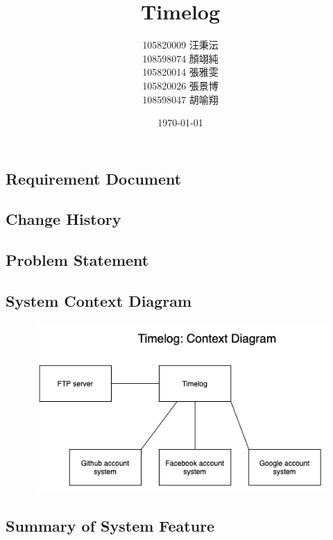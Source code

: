 \documentclass[12pt, a4paper]{article}
\title{Timelog}
\author{105820009 汪秉沄\\
108598074 顏翊純\\
105820014 張雅雯\\
105820026 張景博\\
108598047 胡喻翔}
\date{\today}
\begin{document}
\begin{CJK*}{UTF8}{bkai}
\maketitle
\newpage

\tableofcontents
\newpage


\section{Requirement Document}
  \subsection{Change History}

  \subsection{Problem Statement}

  \subsection{System Context Diagram}
    \begin{figure}[h!]
      \centering
      \includegraphics[width=\linewidth]{img/Context_Diagram.png}
    \end{figure}

  \subsection{Summary of System Feature}


\end{CJK*}
\end{document}
